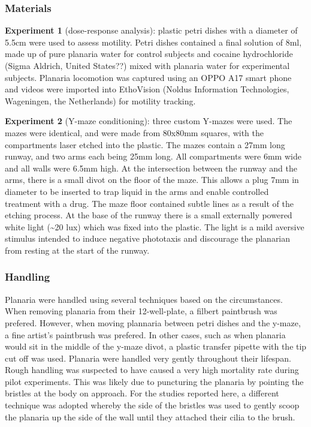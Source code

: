 \documentclass[
  letterpaper,
  DIV=11,
  numbers=noendperiod,
  oneside]{scrartcl}
\begin{document}
\subsubsection{Materials}\label{materials}

\textbf{Experiment 1} (dose-response analysis): plastic petri dishes
with a diameter of 5.5cm were used to assess motility. Petri dishes
contained a final solution of 8ml, made up of pure planaria water for
control subjects and cocaine hydrochloride (Sigma Aldrich, United
States??) mixed with planaria water for experimental subjects. Planaria
locomotion was captured using an OPPO A17 smart phone and videos were
imported into EthoVision (Noldus Information Technologies, Wageningen,
the Netherlands) for motility tracking.

\textbf{Experiment 2} (Y-maze conditioning): three custom Y-mazes were
used. The mazes were identical, and were made from 80x80mm squares, with
the compartments laser etched into the plastic. The mazes contain a 27mm
long runway, and two arms each being 25mm long. All compartments were
6mm wide and all walls were 6.5mm high. At the intersection between the
runway and the arms, there is a small divot on the floor of the maze.
This allows a plug 7mm in diameter to be inserted to trap liquid in the
arms and enable controlled treatment with a drug. The maze floor
contained subtle lines as a result of the etching process. At the base
of the runway there is a small externally powered white light
(\textasciitilde20 lux) which was fixed into the plastic. The light is a
mild aversive stimulus intended to induce negative phototaxis and
discourage the planarian from resting at the start of the runway.

\subsubsection{Handling}\label{handling}

Planaria were handled using several techniques based on the
circumstances. When removing planaria from their 12-well-plate, a
filbert paintbrush was prefered. However, when moving plannaria between
petri dishes and the y-maze, a fine artist's paintbrush was prefered. In
other cases, such as when planaria would sit in the middle of the y-maze
divot, a plastic transfer pipette with the tip cut off was used.
Planaria were handled very gently throughout their lifespan. Rough
handling was suspected to have caused a very high mortality rate during
pilot experiments. This was likely due to puncturing the planaria by
pointing the bristles at the body on approach. For the studies reported
here, a different technique was adopted whereby the side of the bristles
was used to gently scoop the planaria up the side of the wall until they
attached their cilia to the brush.
\end{document}
